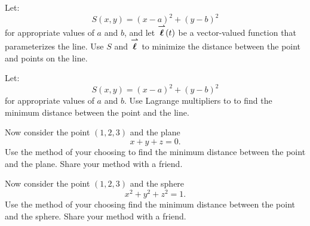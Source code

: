 \documentclass[handout,nooutcomes,noauthor]{ximera}
\begin{document}
\begin{problem}
  Let:
  \[
  S(x,y) = (x-a)^2 + (y-b)^2
  \]
  for appropriate values of $a$ and $b$, and let ${\overset{\boldsymbol{\rightharpoonup}}{\mathbf{\boldsymbol{\ell}}}}(t)$ be a
  vector-valued function that parameterizes the line. Use $S$ and
  ${\overset{\boldsymbol{\rightharpoonup}}{\mathbf{\boldsymbol{\ell}}}}$ to minimize the distance between the point and points on the
  line.
\end{problem}

\begin{problem}
  Let:
  \[
  S(x,y) = (x-a)^2 + (y-b)^2
  \]
  for appropriate values of $a$ and $b$. Use Lagrange multipliers to
  to find the minimum distance between the point and the line.
\end{problem}

\begin{problem}
  Now consider the point $(1,2,3)$ and the plane
  \[
  x + y+z = 0.
  \]
  Use the method of your choosing to find the minimum distance between
  the point and the plane. Share your method with a friend.
\end{problem}


\begin{problem}
  Now consider the point $(1,2,3)$ and the sphere
  \[
  x^2 + y^2+z^2 = 1.
  \]
  Use the method of your choosing find the minimum distance between
  the point and the sphere.  Share your method with a friend.
\end{problem}
\end{document}
